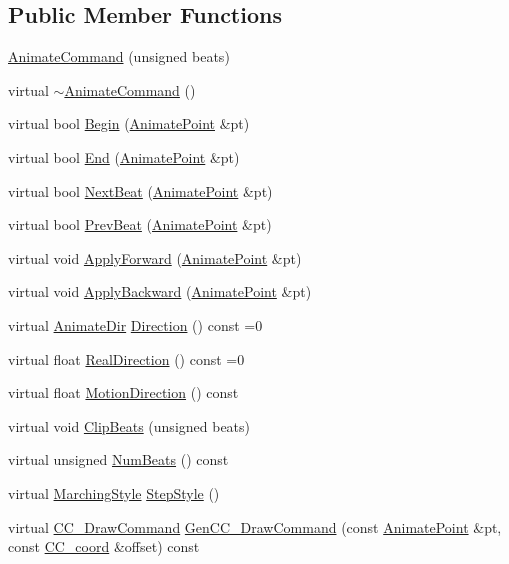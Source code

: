 \subsection*{Public Member Functions}
\begin{DoxyCompactItemize}
\item 
\hyperlink{a00003_aebfee0fad0d8e0fb34b5aa51b4798acc}{Animate\-Command} (unsigned beats)
\item 
virtual \hyperlink{a00003_ac5e46568837cf7ba139dd67df6a2f431}{$\sim$\-Animate\-Command} ()
\item 
virtual bool \hyperlink{a00003_ab69372e28870271550dd8c8a54da02ee}{Begin} (\hyperlink{a00196_a91212e6bb797b2b440819b6a9a86f702}{Animate\-Point} \&pt)
\item 
virtual bool \hyperlink{a00003_ae5dfaac6e8cf870a688a8e3161672b4e}{End} (\hyperlink{a00196_a91212e6bb797b2b440819b6a9a86f702}{Animate\-Point} \&pt)
\item 
virtual bool \hyperlink{a00003_a80bcd30c221c961d87049dee4d9eff5e}{Next\-Beat} (\hyperlink{a00196_a91212e6bb797b2b440819b6a9a86f702}{Animate\-Point} \&pt)
\item 
virtual bool \hyperlink{a00003_aafde773d0e8074306eed850c91c7f207}{Prev\-Beat} (\hyperlink{a00196_a91212e6bb797b2b440819b6a9a86f702}{Animate\-Point} \&pt)
\item 
virtual void \hyperlink{a00003_af8a485b986aacf649f41c81e4d6eeed9}{Apply\-Forward} (\hyperlink{a00196_a91212e6bb797b2b440819b6a9a86f702}{Animate\-Point} \&pt)
\item 
virtual void \hyperlink{a00003_a969de0c473c2ca7d2f3b9ea8748fffb7}{Apply\-Backward} (\hyperlink{a00196_a91212e6bb797b2b440819b6a9a86f702}{Animate\-Point} \&pt)
\item 
virtual \hyperlink{a00196_a6feaf30c8830fe6fcc0982cb7e9621ab}{Animate\-Dir} \hyperlink{a00003_ada84c0464a78c98eb9b24e64f1ea2e36}{Direction} () const =0
\item 
virtual float \hyperlink{a00003_a23b1c7a078df01cb31adaad24d29c27d}{Real\-Direction} () const =0
\item 
virtual float \hyperlink{a00003_af131cd1634440010576620cd6ad8a2c1}{Motion\-Direction} () const 
\item 
virtual void \hyperlink{a00003_ace20ca13c14bf94e13404df0ef825da8}{Clip\-Beats} (unsigned beats)
\item 
virtual unsigned \hyperlink{a00003_af182790906aec055af4e35f3b962f89a}{Num\-Beats} () const 
\item 
virtual \hyperlink{a00196_a56c9857b8353188d8e6823c408ba71ad}{Marching\-Style} \hyperlink{a00003_a245f81fa1ee5a43bbaaa364107b13c1e}{Step\-Style} ()
\item 
virtual \hyperlink{a00031}{C\-C\-\_\-\-Draw\-Command} \hyperlink{a00003_a34d8e8a89c11f7ef6d1e2346db77d462}{Gen\-C\-C\-\_\-\-Draw\-Command} (const \hyperlink{a00196_a91212e6bb797b2b440819b6a9a86f702}{Animate\-Point} \&pt, const \hyperlink{a00029}{C\-C\-\_\-coord} \&offset) const 
\end{DoxyCompactItemize}
